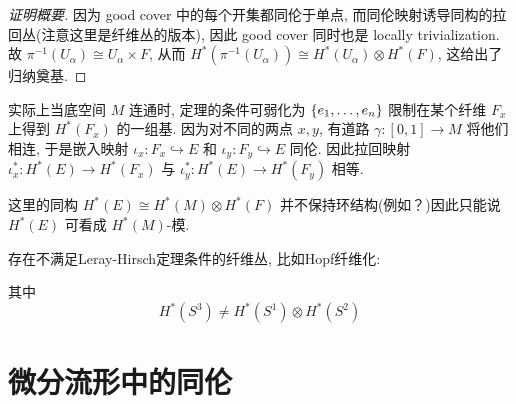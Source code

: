 \begin{proof}[证明概要]
        因为 good cover 中的每个开集都同伦于单点, 而同伦映射诱导同构的拉回丛(注意这里是纤维丛的版本), 因此 good cover 同时也是 locally trivialization.
        故 $\pi^{-1}(U_\alpha)\cong U_{\alpha}\times F$, 从而 $H^*(\pi^{-1}(U_\alpha))\cong H^*(U_{\alpha})\otimes H^*(F)$, 这给出了归纳奠基.
    \end{proof}
    \begin{remark}
        实际上当底空间 $M$ 连通时, 定理的条件可弱化为 $\{{e}_{1},\dots,{e}_{n}\}$ 限制在某个纤维 $F_x$ 上得到 $H^*(F_x)$ 的一组基. 
        因为对不同的两点 $x,y$, 有道路 $\gamma:[0,1]\rightarrow M$ 将他们相连, 于是嵌入映射 $\iota_x:F_x\hookrightarrow E$ 和 $\iota_y:F_y\hookrightarrow E$ 同伦.
        因此拉回映射 $\iota^*_x:H^*(E)\rightarrow H^*(F_x)$ 与 $\iota^*_y:H^*(E)\rightarrow H^*(F_y)$ 相等.
    \end{remark}
    \begin{remark}
        这里的同构 $H^*(E)\cong H^*(M)\otimes H^*(F)$ 并不保持环结构(例如？)因此只能说 $H^*(E)$ 可看成 $H^*(M)$-模.
    \end{remark}
    \begin{remark}
        存在不满足{\rm Leray-Hirsch}定理条件的纤维丛, 比如{\rm Hopf}纤维化:
        \begin{center}
        \end{center}
        其中
        \begin{equation*}
            H^*(S^3)\neq H^*(S^1)\otimes H^*(S^2)
        \end{equation*}
    \end{remark}

    \section{微分流形中的同伦}
